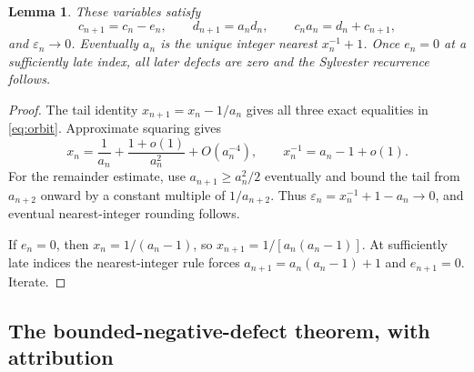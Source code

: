 \documentclass[11pt,a4paper]{article}
\newtheorem{lemma}[theorem]{Lemma}
\theoremstyle{definition}
\theoremstyle{remark}\newtheorem{remark}[theorem]{Remark}
\begin{document}
\begin{lemma}\label{lem:orbit}
These variables satisfy
\begin{equation}\label{eq:orbit}
 c_{n+1}=c_n-e_n,\qquad d_{n+1}=a_nd_n,
 \qquad c_na_n=d_n+c_{n+1},
\end{equation}
and $\varepsilon_n\to0$. Eventually $a_n$ is the unique integer
nearest $x_n^{-1}+1$. Once $e_n=0$ at a sufficiently late index,
all later defects are zero and the Sylvester recurrence follows.
\end{lemma}
\begin{proof}
The tail identity $x_{n+1}=x_n-1/a_n$ gives all three exact
equalities in \eqref{eq:orbit}. Approximate squaring gives
\[
 x_n=\frac1{a_n}+\frac{1+o(1)}{a_n^2}+O(a_n^{-4}),
 \qquad x_n^{-1}=a_n-1+o(1).
\]
For the remainder estimate, use $a_{n+1}\ge a_n^2/2$ eventually
and bound the tail from $a_{n+2}$ onward by a constant multiple
of $1/a_{n+2}$. Thus
$\varepsilon_n=x_n^{-1}+1-a_n\to0$, and eventual nearest-integer
rounding follows.

If $e_n=0$, then $x_n=1/(a_n-1)$, so
$x_{n+1}=1/[a_n(a_n-1)]$. At sufficiently late indices the
nearest-integer rule forces
$a_{n+1}=a_n(a_n-1)+1$ and $e_{n+1}=0$. Iterate.
\end{proof}

\subsection{The bounded-negative-defect theorem, with attribution}
\end{document}
